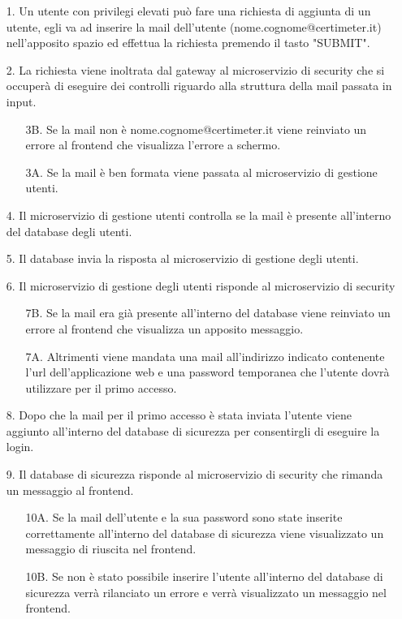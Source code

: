 \begin{itemize}
    \item[1.] Un utente con privilegi elevati può fare una richiesta di aggiunta  di un utente, egli va ad inserire la mail dell'utente (nome.cognome@certimeter.it) nell'apposito spazio ed effettua la richiesta premendo il tasto "SUBMIT".
    \item[2.] La richiesta viene inoltrata dal gateway al microservizio di security che si occuperà di eseguire dei controlli riguardo alla struttura della mail passata in input.
    \begin{itemize}
        \item[3B.] Se la mail non è nome.cognome@certimeter.it viene reinviato un errore al frontend che visualizza l'errore a schermo.
        \item[3A.] Se la mail è ben formata viene passata al microservizio di gestione utenti.
    \end{itemize}
    \item[4.] Il microservizio di gestione utenti controlla se la mail è presente all'interno del database degli utenti.
    \item[5.] Il database invia la risposta al microservizio di gestione degli utenti.
    \item[6.] Il microservizio di gestione degli utenti risponde al microservizio di security
    \begin{itemize}
        \item[7B.] Se la mail era già presente all'interno del database viene reinviato un errore al frontend che visualizza un apposito messaggio.
        \item[7A.] Altrimenti viene mandata una mail all'indirizzo indicato contenente l'url dell'applicazione web e una password temporanea che l'utente dovrà utilizzare per il primo accesso.
    \end{itemize}
    \item[8.] Dopo che la mail per il primo accesso è stata inviata l'utente viene aggiunto all'interno del database di sicurezza per consentirgli di eseguire la login.
    \item[9.] Il database di sicurezza risponde al microservizio di security che rimanda un messaggio al frontend.
    \begin{itemize}
        \item[10A.] Se la mail dell'utente e la sua password sono state inserite correttamente all'interno del database di sicurezza viene visualizzato un messaggio di riuscita nel frontend.
        \item[10B.] Se non è stato possibile inserire l'utente all'interno del database di sicurezza verrà rilanciato un errore e verrà visualizzato un messaggio nel frontend.
    \end{itemize}
\end{itemize}

